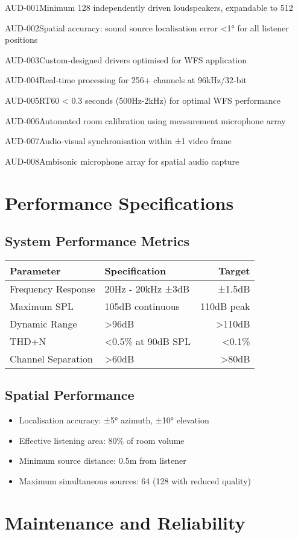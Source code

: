 \begin{requirement}{AUD-001}{Minimum 128 independently driven loudspeakers, expandable to 512}
\begin{requirement}{AUD-002}{Spatial accuracy: sound source localisation error <1° for all listener positions}
\begin{requirement}{AUD-003}{Custom-designed drivers optimised for WFS application}
\begin{requirement}{AUD-004}{Real-time processing for 256+ channels at 96kHz/32-bit}
\begin{requirement}{AUD-005}{RT60 < 0.3 seconds (500Hz-2kHz) for optimal WFS performance}
\begin{requirement}{AUD-006}{Automated room calibration using measurement microphone array}
\begin{requirement}{AUD-007}{Audio-visual synchronisation within ±1 video frame}
\begin{requirement}{AUD-008}{Ambisonic microphone array for spatial audio capture}
\section{Performance Specifications}

\subsection{System Performance Metrics}

\begin{table}[H]
\centering
\begin{tabularx}{\textwidth}{@{}lXr@{}}
\toprule
\textbf{Parameter} & \textbf{Specification} & \textbf{Target} \\
\midrule
Frequency Response & 20Hz - 20kHz ±3dB & ±1.5dB \\
Maximum SPL & 105dB continuous & 110dB peak \\
Dynamic Range & >96dB & >110dB \\
THD+N & <0.5\% at 90dB SPL & <0.1\% \\
Channel Separation & >60dB & >80dB \\
\bottomrule
\end{tabularx}
\end{table}

\subsection{Spatial Performance}

\begin{itemize}
    \item Localisation accuracy: ±5° azimuth, ±10° elevation
    \item Effective listening area: 80\% of room volume
    \item Minimum source distance: 0.5m from listener
    \item Maximum simultaneous sources: 64 (128 with reduced quality)
\end{itemize}

\section{Maintenance and Reliability}


\end{requirement}
\end{requirement}
\end{requirement}
\end{requirement}
\end{requirement}
\end{requirement}
\end{requirement}
\end{requirement}
